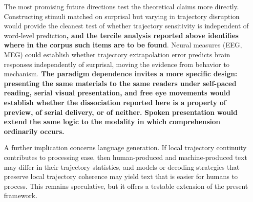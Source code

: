 \documentclass[12pt]{article}
\newcommand{\new}[1]{{\bfseries #1}}
\begin{document}
The most promising future directions test the theoretical claims more directly. Constructing stimuli matched on surprisal but varying in trajectory disruption would provide the cleanest test of whether trajectory sensitivity is independent of word-level prediction\new{, and the tercile analysis reported above identifies where in the corpus such items are to be found}. Neural measures (EEG, MEG) could establish whether trajectory extrapolation error predicts brain responses independently of surprisal, moving the evidence from behavior to mechanism. \new{The paradigm dependence invites a more specific design: presenting the same materials to the same readers under self-paced reading, serial visual presentation, and free eye movements would establish whether the dissociation reported here is a property of preview, of serial delivery, or of neither. Spoken presentation would extend the same logic to the modality in which comprehension ordinarily occurs.}

A further implication concerns language generation. If local trajectory continuity contributes to processing ease, then human-produced and machine-produced text may differ in their trajectory statistics, and models or decoding strategies that preserve local trajectory coherence may yield text that is easier for humans to process. This remains speculative, but it offers a testable extension of the present framework.



\end{document}
